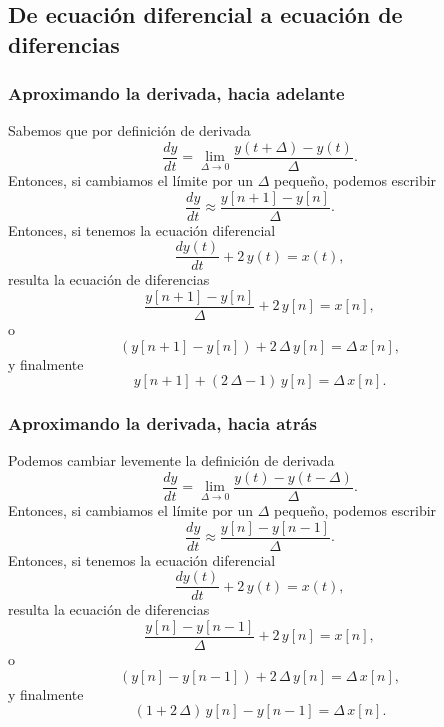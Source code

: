 \documentclass[11pt,a4paper,openany]{book}
\begin{document}
\subsection{De ecuación diferencial a ecuación de diferencias}

\subsubsection{Aproximando la derivada, hacia adelante}
Sabemos que por definición de derivada
\begin{equation}
	\frac{dy}{dt} = \lim_{\Delta \rightarrow 0} \frac{y(t+\Delta) - y(t)}{\Delta}.
\end{equation}
Entonces, si cambiamos el límite por un $\Delta$ pequeño, podemos escribir
\begin{equation}
	\frac{dy}{dt} \approx \frac{y[n+1] - y[n]}{\Delta}.
\end{equation}
Entonces, si tenemos la ecuación diferencial
\begin{equation}
	\frac{dy(t)}{dt} + 2 \, y(t) = x(t),
\end{equation}
resulta la ecuación de diferencias
\begin{equation}
	\frac{y[n+1] - y[n]}{\Delta} + 2 \, y[n] = x[n],
\end{equation}
o
\begin{equation}
	(y[n+1] - y[n]) + 2 \,  \Delta \, y[n] = \Delta \, x[n],
\end{equation}
y finalmente
\begin{equation}
	y[n+1] + (2 \, \Delta - 1) \, y[n] = \Delta \, x[n].
\end{equation}

\subsubsection{Aproximando la derivada, hacia atrás}
Podemos cambiar levemente la definición de derivada
\begin{equation}
	\frac{dy}{dt} = \lim_{\Delta \rightarrow 0} \frac{y(t) - y(t-\Delta)}{\Delta}.
\end{equation}
Entonces, si cambiamos el límite por un $\Delta$ pequeño, podemos escribir
\begin{equation}
	\frac{dy}{dt} \approx \frac{y[n] - y[n-1]}{\Delta}.
\end{equation}
Entonces, si tenemos la ecuación diferencial
\begin{equation}
	\frac{dy(t)}{dt} + 2 \, y(t) = x(t),
\end{equation}
resulta la ecuación de diferencias
\begin{equation}
	\frac{y[n] - y[n-1]}{\Delta} + 2 \, y[n] = x[n],
\end{equation}
o
\begin{equation}
	(y[n] - y[n-1]) + 2 \,  \Delta \, y[n] = \Delta \, x[n],
\end{equation}
y finalmente
\begin{equation}
	(1 + 2 \, \Delta) \, y[n] - y[n-1] = \Delta \, x[n].
\end{equation}
\end{document}
